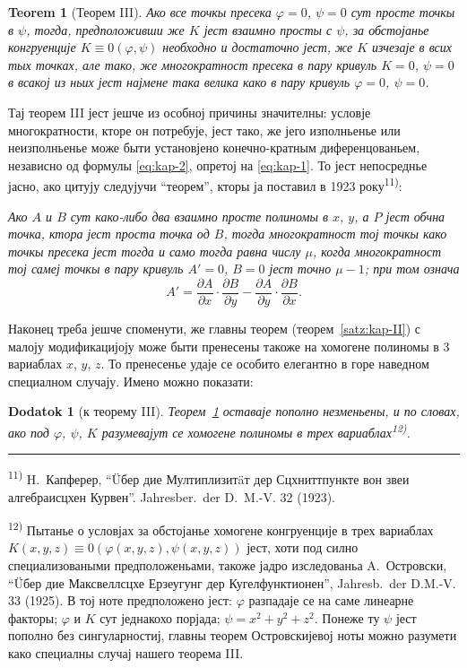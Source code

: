 \documentclass[11pt]{article}
\newcommand{\foreign}[1]{#1}
\theoremstyle{plain}
\newtheorem{satz}{Teorem}
\newtheorem{zusatz}{Dodatok}
\begin{document}
\begin{satz}[Теорем III]\label{satz:kap-III}
Ако все точкы пресека $\varphi = 0$, $\psi = 0$ сут просте точкы в
$\psi$, тогда, предположивши же $K$ јест взаимно просты с $\psi$,
за обстојанье конгруенције $K \equiv 0(\varphi, \psi)$ необходно и
достаточно јест, же $K$ изчезаје в всих тых точках, але тако, же
многократност пресека в пару кривуль $K = 0$, $\psi = 0$ в всакој
из ньих јест најмене така велика како в пару кривуль
$\varphi = 0$, $\psi = 0$.
\end{satz}

Тај теорем III јест јешче из особној причины значителны: условје
многократности, кторе он потребује, јест тако, же јего изполньенье
или неизполньенье може быти установјено конечно-кратным
диференцованьем, независно од формулы \eqref{eq:kap-2}, опретој на
\eqref{eq:kap-1}. То јест непосреднье јасно, ако цитују следујучи
``теорем'', кторы ја поставил в 1923 року\textsuperscript{11)}:

\smallskip
\textit{Ако $A$ и $B$ сут како-либо два взаимно просте полиномы в
$x$, $y$, а $P$ јест обчна точка, ктора јест проста точка од $B$,
тогда многократност тој точкы како точкы пресека јест тогда и само
тогда равна числу $\mu$, когда многократност тој самеј точкы в пару
кривуль $A' = 0$, $B = 0$ јест точно $\mu - 1$; при том означа}
\[
A' = \frac{\partial A}{\partial x} \cdot \frac{\partial B}{\partial y} -
\frac{\partial A}{\partial y} \cdot \frac{\partial B}{\partial x}.
\]

Наконец треба јешче споменути, же главны теорем
(теорем~\ref{satz:kap-II}) с малоју модификацијоју може быти
пренесены такоже на хомогене полиномы в 3 вариаблах $x$, $y$, $z$.
То пренесенье удаје се особито елегантно в горе наведном специалном
случају. Имено можно показати:

\begin{zusatz}[к теорему III]
Теорем~\ref{satz:kap-III} оставаје пополно незменьены, и по словах,
ако под $\varphi$, $\psi$, $K$ разумевајут се хомогене полиномы в
трех вариаблах\textsuperscript{12)}.
\end{zusatz}

\vspace{0.5em}
\noindent\rule{\textwidth}{0.4pt}
\vspace{0.3em}

{\footnotesize
\textsuperscript{11)} H.\ Капферер, ``Üбер дие Мултиплизитäт дер Сцхниттпункте вон звеи алгебраисцхен
Курвен''. \foreign{Jahresber.\ der D.\ M.-V.} 32 (1923).

\textsuperscript{12)} Пытанье о условјах за обстојанье хомогене конгруенције в
трех вариаблах $K(x,y,z) \equiv 0(\varphi(x,y,z), \psi(x,y,z))$ јест,
хоти под силно специализоваными предположеньами, такоже јадро
изследованьа A.\ Островски, ``Üбер дие Максвеллсцхе Ерзеугунг дер
Кугелфунктионен'', \foreign{Jahresb.\ der D.M.-V.} 33 (1925). В тој
ноте предположено јест: $\varphi$ разпадаје се на саме линеарне
факторы; $\varphi$ и $K$ сут једнакохо порјада; $\psi = x^{2} + y^{2} + z^{2}$.
Понеже ту $\psi$ јест пополно без сингуларностиј, главны теорем
Островскијевој ноты можно разумети како специалны случај нашего
теорема III.
}
\end{document}
